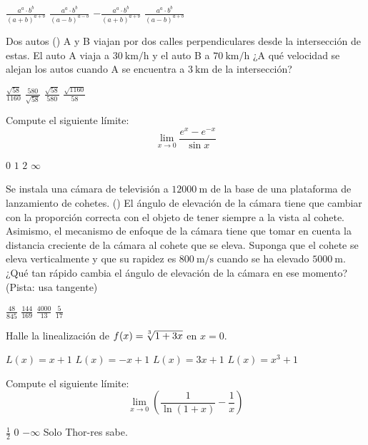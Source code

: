 \begin{checkboxes}
\CorrectChoice $\frac{a^a \cdot b^b}{(a + b)^{a + b}}$
\choice $\frac{a^a \cdot b^b}{(a - b)^{a - b}}$
\choice $-\frac{a^a \cdot b^b}{(a + b)^{a + b}}$
\choice $\frac{a^a \cdot b^b}{(a - b)^{a + b}}$
\end{checkboxes}
\question[5]
Dos autos ({\emoji {}}) A y B viajan por dos calles perpendiculares desde la intersección de  estas. El auto A viaja a $\SI{30}{\kilo\meter\per\hour}$ y el auto B a $\SI{70}{\kilo\meter\per\hour}$ ¿A qué velocidad se alejan los autos cuando A se encuentra a $\SI{3}{\kilo\meter}$ de la intersección?
\droppoints

\begin{checkboxes}
\choice  $\frac{\sqrt{58}}{1160}$
\CorrectChoice $\frac{580}{\sqrt{58}}$
\choice $\frac{\sqrt{58}}{580}$
\choice $\frac{\sqrt{1160}}{58}$
\end{checkboxes}
\question[5]
Compute el siguiente límite:
$$\lim_{x\to0} \frac{e^x - e^{-x}}{\sin{x}}$$
\droppoints

\begin{checkboxes}
\choice $0$
\choice $1$
\CorrectChoice $2$
\choice $\infty$
\end{checkboxes}
\question[5]
Se instala una cámara de televisión a $\SI{12000}{\meter}$ de la base de una plataforma de lanzamiento de cohetes. ({\emoji {}}) El  ángulo de elevación de la cámara tiene que cambiar con la proporción correcta con el objeto de tener siempre a la vista al cohete. Asimismo, el mecanismo de enfoque de la cámara tiene que tomar en cuenta la distancia creciente de la cámara al cohete que se eleva. Suponga que el cohete se eleva verticalmente y que su rapidez es $\SI{800}{\meter\per\second}$ cuando se ha elevado $\SI{5000}{\meter}$. ¿Qué tan rápido cambia el ángulo de elevación de la cámara en ese momento? (Pista: usa tangente)
\droppoints

\begin{checkboxes}
\CorrectChoice $\frac{48}{845}$
\choice $\frac{144}{169}$
\choice $\frac{4000}{13}$
\choice $\frac{5}{17}$
\end{checkboxes}
\pagebreak
\question[5]
Halle la linealización de $f(x) = \sqrt[\leftroot{2}\uproot{2}3]{1+3x}$ en $x=0$.
\droppoints

\begin{checkboxes}
\CorrectChoice $L(x) = x + 1$
\choice $L(x) = -x + 1$
\choice $L(x) = 3x + 1$
\choice $L(x) = x^3 + 1$
\end{checkboxes}
\question[5]
Compute el siguiente límite:
$$\lim_{x\to0}\left(\frac{1}{\ln{(1+x)}}-\frac{1}{x}\right)$$
\droppoints

\begin{checkboxes}
\CorrectChoice $\frac{1}{2}$
\choice $0$
\choice $-\infty$
\choice Solo Thor-res sabe.
\end{checkboxes}
